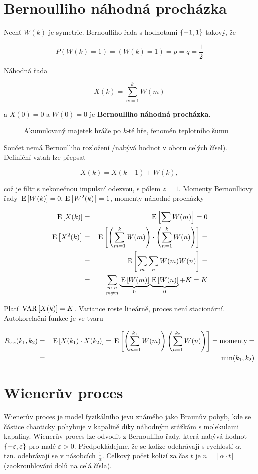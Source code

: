\section{Bernoulliho náhodná procházka}
Nechť $W(k)$ je symetrie. Bernoulliho řada s hodnotami $\left\{-1,1\right\}$ takový, že

\[ P(W(k)=1)=(W(k)=1)=p=q=\frac{1}{2} \]

Náhodná řada

\[ X(k) = \sum_{m=1}^k W(m) \]

a $X(0)=0$ a $W(0)=0$ je \textbf{Bernoulliho náhodná procházka}.

\begin{figure}
\caption{Akumulovaný majetek hráče po $k$-té hře, fenomén teplotního šumu}
\end{figure}

Součet nemá Bernoulliho rozložení /nabývá hodnot v oboru celých čísel). Definiční vztah lze přepsat

\[ X(k) =X(k-1)+W(k), \]

což je filtr s nekonečnou impulsní odezvou, s pólem $z=1$. Momenty Bernoulliovy řady $\,\mathrm{E}\left[W(k)\right]=0,\,\mathrm{E}\left[W^2(k)\right]=1$, momenty náhodné procházky

\begin{eqnarray*}
\,\mathrm{E}\left[X(k)\right] & = & \,\mathrm{E}\left[\sum W(m)\right] = 0\\
\,\mathrm{E}\left[X^2(k)\right] & = & \,\mathrm{E}\left[\left(\sum_{m=1}^k W(m)\right)\cdot\left(\sum_{n=1}^k W(n)\right)\right]=\\
& = & \,\mathrm{E}\left[\sum_m\sum_n W(m)W(n)\right]=\\
& = & \sum_{\substack{m,n\\m\neq n}}\underbrace{\,\mathrm{E}\left[W(m)\right]}_0 \underbrace{\,\mathrm{E}\left[W(n)\right]}_0+K = K
\end{eqnarray*}

Platí $\,\mathrm{VAR}\left[X(k)\right]=K$. Variance roste lineárně, proces není stacionární. Autokorelační funkce je ve tvaru

\begin{eqnarray*}
R_{xx}(k_1,k_2) &=& \,\mathrm{E}\left[X(k_1)\cdot X(k_2)\right]=\,\mathrm{E}\left[\left(\sum_{m=1}^{k_1}W(m)\right)\left(\sum_{n=1}^{k_2}W(n)\right)\right]=\text{momenty}=\\
& = & \min(k_1,k_2)
\end{eqnarray*}

\section{Wienerův proces}
Wienerův proces je model fyzikálního jevu známého jako Braunův pohyb, kde se částice chaoticky pohybuje v kapalině díky náhodným srážkám s molekulami kapaliny. Wienerův proces lze odvodit z Bernoulliho řady, která nabývá hodnot $\left\{-\varepsilon,\varepsilon\right\}$ pro malé $\varepsilon>0$. Předpokládejme, že se kolize odehrávají s rychlostí $\alpha$, tzn. odehrávají se v násobcích $\frac{1}{\alpha}$. Celkový počet kolizí za čas $t$ je $n=\lfloor\alpha\cdot t\rfloor$ (zaokrouhlování dolů na celá čísla).

